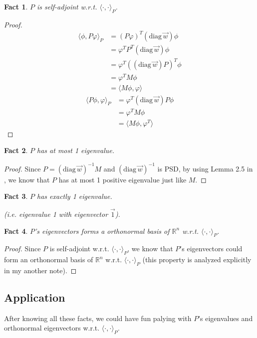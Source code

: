 \documentclass{article}
\newtheorem{fact}{Fact}[section]
\def\diag#1{(\mathrm{diag}\,#1)}
\def\<{\langle}
\def\>{\rangle}
\begin{document}
\begin{fact}
  $P$ is self-adjoint w.r.t. $\<\cdot, \cdot\>_P$.
\end{fact}
\begin{proof}
  \begin{align*}
    \<\phi, P\varphi\>_P
    &= (P\varphi)^T\diag{\vec{w}}\phi \\
    &= \varphi^TP^T\diag{\vec{w}}\phi \\
    &= \varphi^T(\diag{\vec{w}}P)^T\phi \\
    &= \varphi^TM\phi\\
    &= \<M\phi, \varphi\>
  \end{align*}
  \begin{align*}
    \<P\phi, \varphi\>_P
    &= \varphi^T \diag{\vec{w}}P\phi \\
    &= \varphi^T M\phi \\
    &= \<M\phi, \varphi^T\>
  \end{align*}
\end{proof}

\begin{fact}
  $P$ has at most 1 eigenvalue.
\end{fact}
\begin{proof}
Since $P = \diag{\vec{w}}^{-1} M$ and $\diag{\vec{w}}^{-1}$ is PSD, by using Lemma 2.5 in \cite{anari2019log}, we know that $P$ has at most 1 positive eigenvalue just like $M$.
\end{proof}

\begin{fact}
  $P$ has exactly 1 eigenvalue.
  
  (i.e. eigenvalue 1 with eigenvector $\vec{1}$).
\end{fact}

\begin{fact}
  $P$'s eigenvectors forms a orthonormal basis of $\mathbb{R}^n$ w.r.t. $\<\cdot, \cdot\>_P$.
\end{fact}
\begin{proof}
Since $P$ is self-adjoint w.r.t. $\<\cdot, \cdot\>_P$, we know that $P$'s eigenvectors could form an orthonormal basis of $\mathbb{R}^n$ w.r.t. $\<\cdot, \cdot\>_P$ (this property is analyzed explicitly in my another note).
\end{proof}

\subsection{Application}
After knowing all these facts, we could have fun palying with $P$'s eigenvalues and orthonormal eigenvectors w.r.t. $\<\cdot, \cdot\>_P$.
\end{document}
